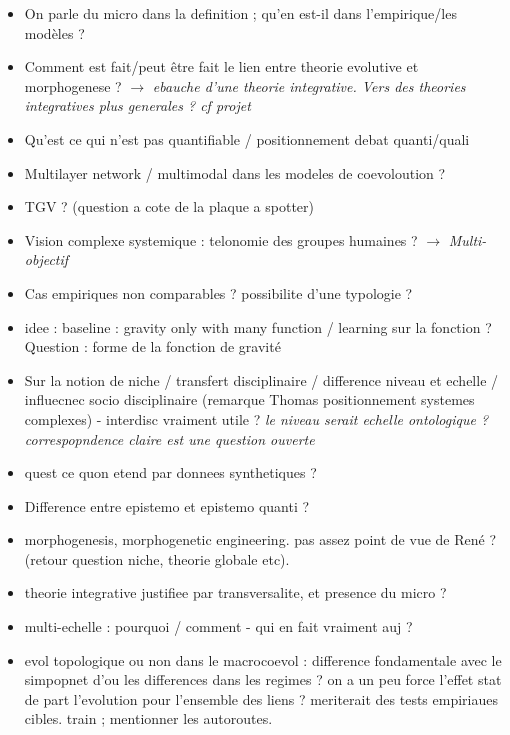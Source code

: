 \documentclass[11pt]{article}
\begin{document}
\begin{itemize}
	\item On parle du micro dans la definition ; qu'en est-il dans l'empirique/les modèles ?
	\item Comment est fait/peut être fait le lien entre theorie evolutive et morphogenese ? $\rightarrow$ \textit{ebauche d'une theorie integrative. Vers des theories integratives plus generales ? cf projet}
	\item Qu'est ce qui n'est pas quantifiable / positionnement debat quanti/quali
	\item Multilayer network / multimodal dans les modeles de coevoloution ?
	\item TGV ? (question a cote de la plaque a spotter)
	\item Vision complexe systemique : telonomie des groupes humaines ? $\rightarrow$ \textit{Multi-objectif}
	\item Cas empiriques non comparables ? possibilite d'une typologie ?
	\item idee : baseline : gravity only with many function / learning sur la fonction ? Question : forme de la fonction de gravité
	\item Sur la notion de niche / transfert disciplinaire / difference niveau et echelle / influecnec socio disciplinaire (remarque Thomas positionnement systemes complexes) - interdisc vraiment utile ? \textit{le niveau serait echelle ontologique ? correspopndence claire est une question ouverte}
	\item quest ce quon etend par donnees synthetiques ?
	\item Difference entre epistemo et epistemo quanti ?
	\item morphogenesis, morphogenetic engineering. pas assez point de vue de René ? (retour question niche, theorie globale etc).
	\item theorie integrative justifiee par transversalite, et presence du micro ?
	\item multi-echelle : pourquoi / comment - qui en fait vraiment auj ?
	\item evol topologique ou non dans le macrocoevol : difference fondamentale avec le simpopnet d'ou les differences dans les regimes ? on a un peu force l'effet stat de part l'evolution pour l'ensemble des liens ? meriterait des tests empiriaues cibles. train ; mentionner les autoroutes.
	
\end{itemize}


\end{document}
